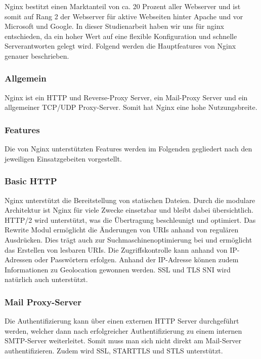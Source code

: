Nginx bestitzt einen Marktanteil von ca. 20 Prozent aller Webserver und ist somit auf Rang 2 der Webserver für aktive Webseiten hinter Apache und vor Microsoft und Google\cite{.k}. In dieser Studienarbeit haben wir uns für nginx entschieden, da ein hoher Wert auf eine flexible Konfiguration und schnelle Serverantworten gelegt wird. Folgend werden die Hauptfeatures von Nginx genauer beschrieben.

\subsubsection{Allgemein}
\label{sec:NginxAllgemein}
Nginx ist ein HTTP und Reverse-Proxy Server, ein Mail-Proxy Server und ein allgemeiner TCP/UDP Proxy-Server. Somit hat Nginx eine hohe Nutzungsbreite.

\subsubsection{Features}
\label{sec:NginxFeatures}
Die von Nginx unterstützten Features werden im Folgenden gegliedert nach den jeweiligen Einsatzgebeiten vorgestellt.\cite{.14.03.2017}


\subsubsection{Basic HTTP}
\label{sec:NginxBasicHTTP}
Nginx unterstützt die Bereitstellung von statischen Dateien. Durch die modulare Architektur ist Nginx für viele Zwecke einsetzbar und bleibt dabei übersichtlich. HTTP/2 wird unterstützt, was die Übertragung beschleunigt und optimiert. Das Rewrite Modul ermöglicht die Änderungen von URIs anhand von regulären Ausdrücken. Dies trägt auch zur Suchmaschinenoptimierung bei und ermöglicht das Erstellen von lesbaren URIs. Die Zugriffskontrolle kann anhand von IP-Adressen oder Passwörtern erfolgen. Anhand der IP-Adresse können zudem Informationen zu Geolocation gewonnen werden. SSL und TLS SNI wird natürlich auch unterstützt.

\subsubsection{Mail Proxy-Server}
\label{sec:NginxMail Proxy-Server}
Die Authentifizierung kann über einen externen HTTP Server durchgeführt werden, welcher dann nach erfolgreicher Authentifizierung zu einem internen SMTP-Server weiterleitet. Somit muss man sich nicht direkt am Mail-Server authentifizieren. Zudem wird SSL, STARTTLS und STLS unterstützt.

